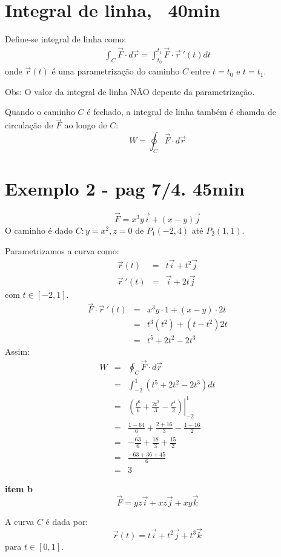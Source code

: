 \documentclass[a4paper,10pt]{book}
\begin{document}
\section{Integral de linha, ~40min}
Define-se integral de linha como:
\begin{eqnarray*}
 \int_C \vec{F}\cdot d\vec{r}=\int_{t_0}^{t_1} \vec{F}\cdot\vec{r}\!~'(t)dt
\end{eqnarray*}
onde $\vec{r}(t)$ é uma parametrização do caminho $C$ entre $t=t_0$ e $t=t_1$.

Obs: O valor da integral de linha NÃO depente da parametrização.

Quando o caminho $C$ é fechado, a integral de linha também é chamda de circulação de $\vec{F}$ ao longo de $C$:
$$W=\oint_C \vec{F}\cdot d\vec{r}$$

\section{Exemplo 2 - pag 7/4. 45min}
$$\vec{F}=x^3y\vec{i}+ (x-y)\vec{j}$$
O caminho é dado $C:y=x^2, z=0$ de $P_1(-2,4)$ até $P_2(1,1)$.

Parametrizamos a curva como:
\begin{eqnarray*}
\vec{r}(t)&=&t\vec{i}+t^2\vec{j}\\
\vec{r}\!~'(t)&=&\vec{i}+2t\vec{j}
\end{eqnarray*}
com $t\in [-2,1]$.
\begin{eqnarray*}
\vec{F}\cdot \vec{r}\!~'(t)&=&x^3y\cdot 1 + (x-y)\cdot 2t\\
&=&t^3(t^2)+(t-t^2)2t\\
&=&t^5+2t^2-2t^3
\end{eqnarray*}
Assim:
\begin{eqnarray*}
 W&=&\oint_C \vec{F}\cdot d\vec{r}\\
 &=&\int_{-2}^1\left(t^5+2t^2-2t^3\right)dt\\
 &=&\left.\left(\frac{t^6}{6}+\frac{2t^3}{3}-\frac{t^4}{2}\right)\right|_{-2}^1\\
 &=&\frac{1-64}{6}+\frac{2+16}{3}-\frac{1-16}{2}\\
 &=&-\frac{63}{6}+\frac{18}{3}+\frac{15}{2}\\
 &=&\frac{-63+36+45}{6}\\
 &=&3
 \end{eqnarray*}

{\bf item b}
$$\vec{F}=yz\vec{i}+xz\vec{j}+xy\vec{k}$$

A curva  $C$ é dada por:
$$\vec{r}(t)=t\vec{i}+t^2\vec{j}+t^3\vec{k}$$
para $t\in [0,1]$.
\end{document}

